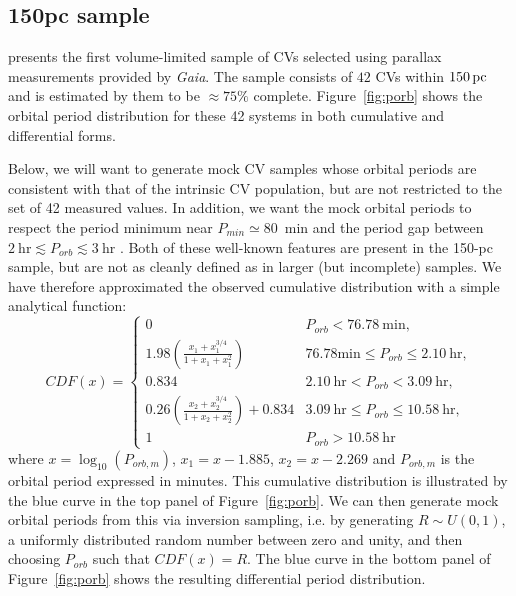 \documentclass[fleqn,usenatbib]{mnras}
\newcommand{\gaia}{{\it Gaia}}
\begin{document}
\subsection{150pc sample} \label{sec:150pc}

\cite{pala20} presents the first volume-limited sample of CVs selected using parallax measurements provided by \gaia. The sample consists of $42$ CVs within $150\,\rm{pc}$ and is estimated by them to be $\approx 75\%$ complete. Figure~\ref{fig:porb} shows the orbital period distribution for these 42 systems in both cumulative and differential forms.

Below, we will want to generate mock CV samples whose orbital periods are consistent with that of the intrinsic CV population, but are not restricted to the set of 42 measured values. In addition, we want the mock orbital periods to respect the period minimum near $P_{min} \simeq 80$~min and the period gap between $2~\mathrm{hr} \lesssim P_{orb} \lesssim 3~\mathrm{hr}$ \citep[e.g.][]{gansicke09, knigge06}. Both of these well-known features are present in the \cite{pala20} 150-pc sample, but are not as cleanly defined as in larger (but incomplete) samples. We have therefore approximated the observed cumulative distribution with a simple analytical function:
\begin{equation}
CDF(x) = 
\begin{cases}
      0 & P_{orb} < 76.78~\mathrm{min}, \\
      1.98 \left(\frac{x_1 + x_1^{3/4}}{1 + x_1 + x_1^2}\right) & 76.78 \mathrm{min} \leq P_{orb} \leq 2.10~\mathrm{hr},\\
      0.834 & 2.10~\mathrm{hr} < P_{orb} < 3.09~\mathrm{hr},\\
      0.26 \left(\frac{x_2 + x_2^{3/4}}{1 + x_2 + x_2^2}\right) + 0.834  & 3.09~\mathrm{hr} \leq P_{orb} \leq 10.58~\mathrm{hr},\\
      1 & P_{orb} > 10.58~\mathrm{hr}
\end{cases}
\label{eq:cdf}
\end{equation}
where $x = \log_{10}({P_{orb,m}})$, $x_1 = x - 1.885$, $x_2 = x - 2.269$
and $P_{orb,m}$ is the orbital period expressed in minutes. This cumulative  distribution is illustrated by the blue curve in the top panel of Figure~\ref{fig:porb}. We can then generate mock orbital periods from this via inversion sampling, i.e. by generating $R \sim U(0,1)$, a uniformly distributed random number between zero and unity, and then choosing $P_{orb}$ such that $CDF(x) = R$. The blue curve in the bottom panel of Figure~\ref{fig:porb} shows the resulting differential period distribution.
\end{document}
